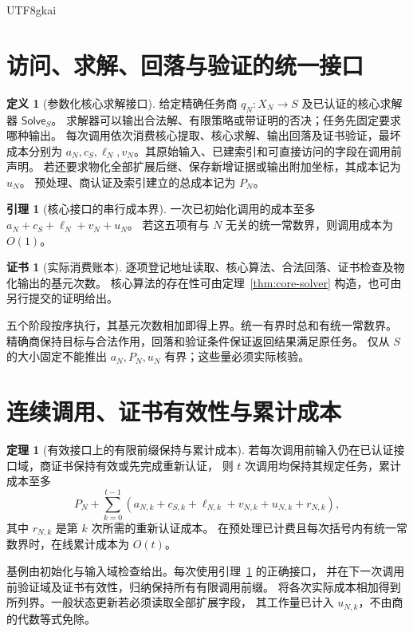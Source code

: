 \documentclass[12pt]{report}
\makeatletter
\theoremstyle{definition}
\newtheorem{definition}{定义}[chapter]
\newtheorem{theorem}{定理}[chapter]
\newtheorem{lemma}{引理}[chapter]
\newtheorem{Certificate}{证书}[chapter]
\renewenvironment{proof}[1][\proofname]{\par
  \pushQED{\qed}\normalfont
  \topsep6\p@\@plus6\p@\relax
  \trivlist
  \item[\hskip\labelsep\normalfont #1\@addpunct{.}]\ignorespaces
}{
  \popQED\endtrivlist\@endpefalse
}
\makeatother
\begin{document}
\begin{CJK*}{UTF8}{gkai}
\section{访问、求解、回落与验证的统一接口}
\begin{definition}[参数化核心求解接口]
\label{def:core-cost-interface}
给定精确任务商 \(q_N:X_N\to S\) 及已认证的核心求解器 \(\mathsf{Solve}_S\)。
求解器可以输出合法解、有限策略或带证明的否决；任务先固定要求哪种输出。
每次调用依次消费核心提取、核心求解、输出回落及证书验证，最坏成本分别为
\(a_N,c_S,\ell_N,v_N\)。其原始输入、已建索引和可直接访问的字段在调用前声明。
若还要求物化全部扩展后继、保存新增证据或输出附加坐标，其成本记为 \(u_N\)。
预处理、商认证及索引建立的总成本记为 \(P_N\)。
\end{definition}
\begin{lemma}[核心接口的串行成本界]
\label{lem:cost}
一次已初始化调用的成本至多
\(a_N+c_S+\ell_N+v_N+u_N\)。
若这五项有与 \(N\) 无关的统一常数界，则调用成本为 \(O(1)\)。
\end{lemma}
\begin{Certificate}[实际消费账本]
逐项登记地址读取、核心算法、合法回落、证书检查及物化输出的基元次数。
核心算法的存在性可由定理~\ref{thm:core-solver} 构造，也可由另行提交的证明给出。
\end{Certificate}
\begin{proof}
五个阶段按序执行，其基元次数相加即得上界。统一有界时总和有统一常数界。
精确商保持目标与合法作用，回落和验证条件保证返回结果满足原任务。
仅从 \(S\) 的大小固定不能推出 \(a_N,P_N,u_N\) 有界；这些量必须实际核验。
\end{proof}

\section{连续调用、证书有效性与累计成本}
\begin{theorem}[有效接口上的有限前缀保持与累计成本]
\label{thm:time}
若每次调用前输入仍在已认证接口域，商证书保持有效或先完成重新认证，
则 \(t\) 次调用均保持其规定任务，累计成本至多
\[
P_N+\sum_{k=0}^{t-1}(a_{N,k}+c_{S,k}+\ell_{N,k}+v_{N,k}+u_{N,k}+r_{N,k}),
\]
其中 \(r_{N,k}\) 是第 \(k\) 次所需的重新认证成本。
在预处理已计费且每次括号内有统一常数界时，在线累计成本为 \(O(t)\)。
\end{theorem}
\begin{proof}
基例由初始化与输入域检查给出。每次使用引理~\ref{lem:cost} 的正确接口，
并在下一次调用前验证域及证书有效性，归纳保持所有有限调用前缀。
将各次实际成本相加得到所列界。一般状态更新若必须读取全部扩展字段，
其工作量已计入 \(u_{N,k}\)，不由商的代数等式免除。
\end{proof}


\end{CJK*}
\end{document}
